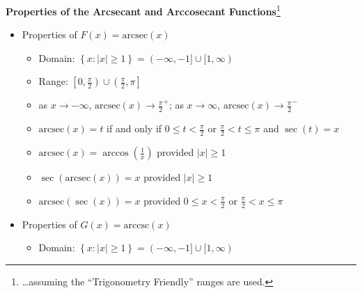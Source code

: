 \documentclass[12pt]{ximera}
\begin{document}
\smallskip


\begin{theorem} \label{arcsecantcosecantfunctionprops1}  \textbf{Properties of the Arcsecant and Arccosecant Functions}\footnote{\ldots assuming the ``Trigonometry Friendly'' ranges are used.} 

\begin{itemize}

\item Properties of $F(x)= \mbox{arcsec}(x)$  

\begin{itemize}

\item Domain:  $\left\{ x : |x| \geq 1 \right\} = (-\infty, -1] \cup [1,\infty)$

\item Range:  $\left[0, \frac{\pi}{2} \right) \cup \left(\frac{\pi}{2}, \pi\right]$

\item  as $x \rightarrow -\infty$, $\mbox{arcsec}(x) \rightarrow \frac{\pi}{2}^{+}$;  as $x \rightarrow \infty$, $\mbox{arcsec}(x) \rightarrow \frac{\pi}{2}^{-}$

\item  $\mbox{arcsec}(x) = t$ if and only if $0 \leq t < \frac{\pi}{2}$ or $ \frac{\pi}{2} < t \leq \pi$ and $\sec(t) = x$

\item  $\mbox{arcsec}(x) = \arccos\left(\frac{1}{x}\right)$ provided $|x| \geq 1$

\item  $\sec\left(\mbox{arcsec}(x)\right) = x$ provided $|x| \geq 1$

\item  $\mbox{arcsec}(\sec(x)) = x$ provided $0 \leq x < \frac{\pi}{2}$ or $\frac{\pi}{2} < x \leq \pi$

\end{itemize}

\item  Properties of $G(x) = \mbox{arccsc}(x)$  

\begin{itemize}

\item  Domain:  $\left\{ x : |x| \geq 1 \right\} = (-\infty, -1] \cup [1,\infty)$


\end{itemize}
\end{itemize}
\end{theorem}
\end{document}
